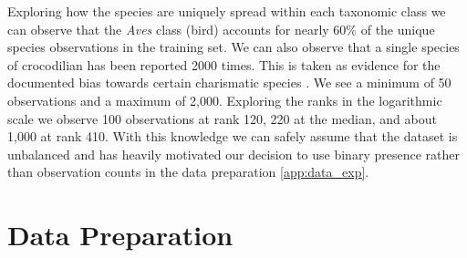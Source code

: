 \documentclass{article}
\begin{document}
Exploring how the species are uniquely spread within each taxonomic class we can observe that the \textit{Aves} class (bird) accounts for nearly 60\% of the unique species observations in the training set. We can also observe that a single species of crocodilian has been reported 2000 times. This is taken as evidence for the documented bias towards certain charismatic species \cite{lange2025feedforwardfewshotspeciesrange}. 
We see a minimum of 50 observations and a maximum of 2,000. Exploring the ranks in the logarithmic scale we observe 100 observations at rank 120, 220 at the median, and about 1,000 at rank 410. With this knowledge we can safely assume that the dataset is unbalanced and has heavily motivated our decision to use binary presence rather than observation counts in the data preparation \ref{app:data_exp}.

\section{Data Preparation}\label{data_prep}
\end{document}
